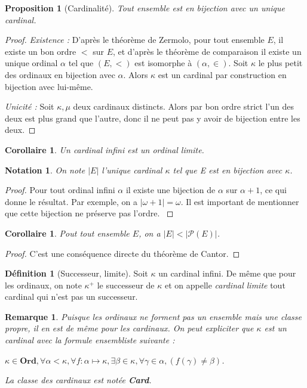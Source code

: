 \documentclass[french]{article}
\theoremstyle{definition}
\newtheorem{definition}[subsubsection]{Définition}
\theoremstyle{plain}
\newtheorem{proposition}[subsubsection]{Proposition}
\theoremstyle{plain}
\newtheorem{corollary}[subsubsection]{Corollaire}
\theoremstyle{plain}
\theoremstyle{plain}
\newtheorem{remark}[subsubsection]{Remarque}
\theoremstyle{plain}
\newtheorem*{notation}{Notation}
\begin{document}
\begin{proposition}[Cardinalité]
	Tout ensemble est en bijection avec un unique cardinal.
\end{proposition}
\begin{proof}	
	\textit{Existence :} D'après le théorème de Zermolo, pour tout ensemble \( E \), il existe un bon ordre \( < \) sur \( E \), et d'après le théorème de comparaison il existe un unique ordinal \( \alpha \) tel que \( (E,<) \) est isomorphe à \( (\alpha,\in) \). Soit \( \kappa \) le plus petit des ordinaux en bijection avec \( \alpha \). Alors \( \kappa \) est un cardinal par construction en bijection avec lui-même. 

	\textit{Unicité : } Soit \( \kappa, \mu \) deux cardinaux distincts. Alors par bon ordre strict l'un des deux est plus grand que l'autre, donc il ne peut pas y avoir de bijection entre les deux.
\end{proof}

\begin{corollary}
	Un cardinal infini est un ordinal limite.
\end{corollary}
\begin{notation}
	On note \( |E| \) l'unique cardinal \( \kappa \) tel que E est en bijection avec \( \kappa \).
\end{notation}

\begin{proof}
	Pour tout ordinal infini \( \alpha \) il existe une bijection de \( \alpha \) sur \( \alpha + 1 \), ce qui donne le résultat. Par exemple, on a \( |\omega + 1| = \omega \). Il est important de mentionner que cette bijection ne préserve pas l'ordre. \cite{gowers2010ordinals}
\end{proof}

\begin{corollary}
	Pout tout ensemble \( E \), on a \( |E| < |\mathcal{P}(E)| \).
\end{corollary}
\begin{proof}
	C'est une conséquence directe du théorème de Cantor.
\end{proof}

\begin{definition}[Successeur, limite]
	Soit \( \kappa \) un cardinal infini. De même que pour les ordinaux, on note \( \kappa^{+} \) le successeur de \( \kappa \) et on appelle \textit{cardinal limite} tout cardinal qui n'est pas un successeur.
\end{definition}

\begin{remark}
	Puisque les ordinaux ne forment pas un ensemble mais une classe propre, il en est de même pour les cardinaux. On peut expliciter que \( \kappa \) est un cardinal avec la formule ensembliste suivante :

	\par \( \kappa \in \textbf{Ord},  \forall{\alpha < \kappa}, \forall{f : \alpha \mapsto \kappa}, \exists{\beta \in \kappa}, \forall{\gamma \in \alpha}, (f(\gamma) \neq \beta) \).

	La classe des cardinaux est notée \textbf{Card}.
\end{remark}
\end{document}
